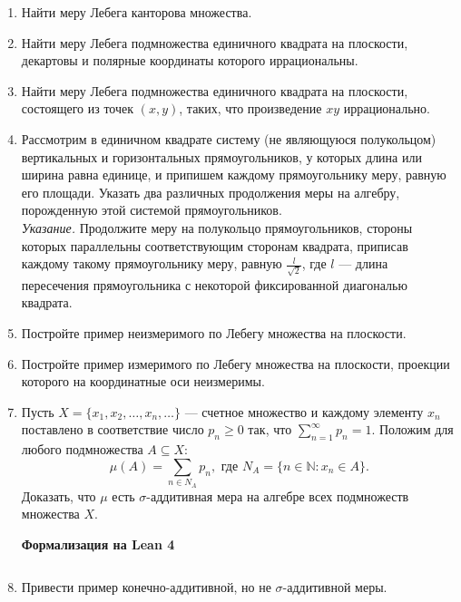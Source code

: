 \documentclass[12pt,a4paper]{article}
\begin{document}
\begin{enumerate}
\newpage

\item Найти меру Лебега канторова множества.

\item Найти меру Лебега подмножества единичного квадрата на плоскости, декартовы и полярные координаты которого иррациональны.

\item Найти меру Лебега подмножества единичного квадрата на плоскости, состоящего из точек $(x, y)$, таких, что произведение $xy$ иррационально.

\item Рассмотрим в единичном квадрате систему (не являющуюся полукольцом) вертикальных и горизонтальных прямоугольников, у которых длина или ширина равна единице, и припишем каждому прямоугольнику меру, равную его площади. Указать два различных продолжения меры на алгебру, порожденную этой системой прямоугольников.\\
\textit{Указание.} Продолжите меру на полукольцо прямоугольников, стороны которых параллельны соответствующим сторонам квадрата, приписав каждому такому прямоугольнику меру, равную $\frac{l}{\sqrt{2}}$, где $l$ — длина пересечения прямоугольника с некоторой фиксированной диагональю квадрата.

\item Постройте пример неизмеримого по Лебегу множества на плоскости.
\item Постройте пример измеримого по Лебегу множества на плоскости, проекции которого на координатные оси неизмеримы.

\newpage
\item Пусть $X = \{x_{1}, x_{2}, \dots, x_{n}, \dots\}$ — счетное множество и каждому элементу $x_{n}$ поставлено в соответствие число $p_{n} \ge 0$ так, что $\sum_{n=1}^{\infty} p_{n} = 1$. Положим для любого подмножества $A \subseteq X$:
$$\mu(A) = \sum_{n \in N_{A}} p_{n}, \text{ где } N_{A} = \{n \in \mathbb{N} : x_{n} \in A\}.$$
Доказать, что $\mu$ есть $\sigma$-аддитивная мера на алгебре всех подмножеств множества $X$.


\begin{center}\small\textbf{Формализация на Lean 4}\end{center}
\inputminted{lean}{FunAn/Section02_Measure/Task11.lean}

\newpage

\item Привести пример конечно-аддитивной, но не $\sigma$-аддитивной меры.


\end{enumerate}
\end{document}
